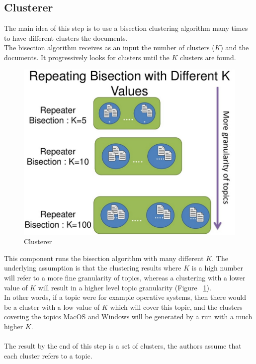 \documentclass[4pt,a4paper,twocolumn]{article}
\begin{document}
\subsection{Clusterer}
The main idea of this step is to use a bisection clustering algorithm many times to have different clusters the documents.\\
The bisection algorithm receives as an input the number of clusters ($K$) and the documents. It progressively looks for clusters until the $K$ clusters are found.
\begin{figure}[]
  \centering
    \includegraphics[scale=0.2]{pics/clusterer2.jpg}
    \caption{Clusterer}
   \label{fig:clusterer}  
\end{figure}

This component runs the bisection algorithm with many different $K$. The underlying assumption is that the clustering results where $K$ is a high number will refer to a more fine granularity of topics, whereas a clustering with a lower value of $K$ will result in a higher level topic granularity (Figure ~\ref{fig:clusterer}).\\
In other words, if a topic were for example operative systems, then there would be a cluster with a low value of $K$ which will cover this topic, and the clusters covering the topics MacOS and Windows will be generated by a run with a much higher $K$.\\
\\
The result by the end of this step is a set of clusters, the authors assume that each cluster refers to a topic.
\end{document}
